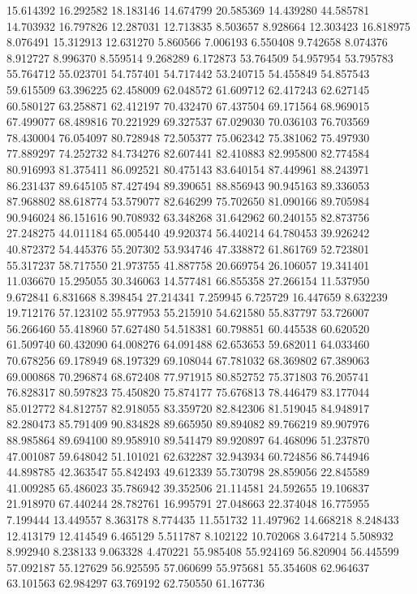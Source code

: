 15.614392
16.292582
18.183146
14.674799
20.585369
14.439280
44.585781
14.703932
16.797826
12.287031
12.713835
8.503657
8.928664
12.303423
16.818975
8.076491
15.312913
12.631270
5.860566
7.006193
6.550408
9.742658
8.074376
8.912727
8.996370
8.559514
9.268289
6.172873
53.764509
54.957954
53.795783
55.764712
55.023701
54.757401
54.717442
53.240715
54.455849
54.857543
59.615509
63.396225
62.458009
62.048572
61.609712
62.417243
62.627145
60.580127
63.258871
62.412197
70.432470
67.437504
69.171564
68.969015
67.499077
68.489816
70.221929
69.327537
67.029030
70.036103
76.703569
78.430004
76.054097
80.728948
72.505377
75.062342
75.381062
75.497930
77.889297
74.252732
84.734276
82.607441
82.410883
82.995800
82.774584
80.916993
81.375411
86.092521
80.475143
83.640154
87.449961
88.243971
86.231437
89.645105
87.427494
89.390651
88.856943
90.945163
89.336053
87.968802
88.618774
53.579077
82.646299
75.702650
81.090166
89.705984
90.946024
86.151616
90.708932
63.348268
31.642962
60.240155
82.873756
27.248275
44.011184
65.005440
49.920374
56.440214
64.780453
39.926242
40.872372
54.445376
55.207302
53.934746
47.338872
61.861769
52.723801
55.317237
58.717550
21.973755
41.887758
20.669754
26.106057
19.341401
11.036670
15.295055
30.346063
14.577481
66.855358
27.266154
11.537950
9.672841
6.831668
8.398454
27.214341
7.259945
6.725729
16.447659
8.632239
19.712176
57.123102
55.977953
55.215910
54.621580
55.837797
53.726007
56.266460
55.418960
57.627480
54.518381
60.798851
60.445538
60.620520
61.509740
60.432090
64.008276
64.091488
62.653653
59.682011
64.033460
70.678256
69.178949
68.197329
69.108044
67.781032
68.369802
67.389063
69.000868
70.296874
68.672408
77.971915
80.852752
75.371803
76.205741
76.828317
80.597823
75.450820
75.874177
75.676813
78.446479
83.177044
85.012772
84.812757
82.918055
83.359720
82.842306
81.519045
84.948917
82.280473
85.791409
90.834828
89.665950
89.894082
89.766219
89.907976
88.985864
89.694100
89.958910
89.541479
89.920897
64.468096
51.237870
47.001087
59.648042
51.101021
62.632287
32.943934
60.724856
86.744946
44.898785
42.363547
55.842493
49.612339
55.730798
28.859056
22.845589
41.009285
65.486023
35.786942
39.352506
21.114581
24.592655
19.106837
21.918970
67.440244
28.782761
16.995791
27.048663
22.374048
16.775955
7.199444
13.449557
8.363178
8.774435
11.551732
11.497962
14.668218
8.248433
12.413179
12.414549
6.465129
5.511787
8.102122
10.702068
3.647214
5.508932
8.992940
8.238133
9.063328
4.470221
55.985408
55.924169
56.820904
56.445599
57.092187
55.127629
56.925595
57.060699
55.975681
55.354608
62.964637
63.101563
62.984297
63.769192
62.750550
61.167736
